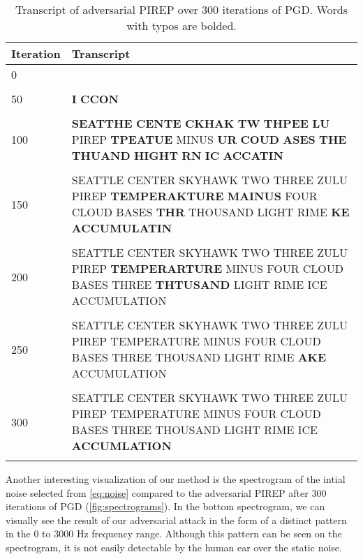 \begin{table}[h]
  \centering
  \begin{tabularx}{\textwidth}{lX}
    \hline
    Iteration & Transcript \\
    \hline
    0         &            \\\\
    50        & \textbf{I} \textbf{CCON}     \\\\
    100       & \textbf{SEATTHE} \textbf{CENTE} \textbf{CKHAK} \textbf{TW} \textbf{THPEE} \textbf{LU} PIREP \textbf{TPEATUE} MINUS \textbf{UR} \textbf{COUD} \textbf{ASES} \textbf{THE} \textbf{THUAND} \textbf{HIGHT} \textbf{RN} \textbf{IC} \textbf{ACCATIN} \\\\
    150       & SEATTLE CENTER SKYHAWK TWO THREE ZULU PIREP \textbf{TEMPERAKTURE} \textbf{MAINUS} FOUR CLOUD BASES \textbf{THR} THOUSAND LIGHT RIME \textbf{KE} \textbf{ACCUMULATIN} \\\\
    200       & SEATTLE CENTER SKYHAWK TWO THREE ZULU PIREP \textbf{TEMPERARTURE} MINUS FOUR CLOUD BASES THREE \textbf{THTUSAND} LIGHT RIME ICE ACCUMULATION \\\\
    250       & SEATTLE CENTER SKYHAWK TWO THREE ZULU PIREP TEMPERATURE MINUS FOUR CLOUD BASES THREE THOUSAND LIGHT RIME \textbf{AKE} ACCUMULATION \\\\
    300       & SEATTLE CENTER SKYHAWK TWO THREE ZULU PIREP TEMPERATURE MINUS FOUR CLOUD BASES THREE THOUSAND LIGHT RIME ICE \textbf{ACCUMLATION} \\\\
    \hline
  \end{tabularx}
  \caption{Transcript of adversarial PIREP over 300 iterations of PGD. Words with typos are bolded.}
  \label{tab:attack_transcript}
\end{table}

Another interesting visualization of our method is the spectrogram of the intial
noise selected from \autoref{eq:noise} compared to the adversarial PIREP after
300 iterations of PGD (\autoref{fig:spectrograms}). In the bottom spectrogram,
we can visually see the result of our adversarial attack in the form of a
distinct pattern in the 0 to 3000 Hz frequency range. Although this pattern can
be seen on the spectrogram, it is not easily detectable by the human ear over
the static noise.

